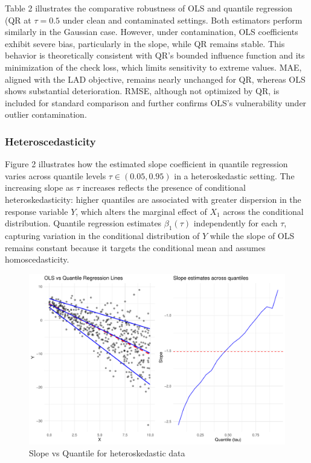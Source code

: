 \documentclass[fleqn,10pt]{latex/stylish_article} %
\begin{document}
Table 2 illustrates the comparative robustness of OLS and quantile regression (QR at \(\tau = 0.5\) under clean and contaminated settings. Both estimators perform similarly in the Gaussian case. However, under contamination, OLS coefficients exhibit severe bias, particularly in the slope, while QR remains stable. This behavior is theoretically consistent with QR's bounded influence function and its minimization of the check loss, which limits sensitivity to extreme values. MAE, aligned with the LAD objective, remains nearly unchanged for QR, whereas OLS shows substantial deterioration. RMSE, although not optimized by QR, is included for standard comparison and further confirms OLS's vulnerability under outlier contamination.

\subsubsection{Heteroscedasticity}\label{heteroscedasticity}

Figure 2 illustrates how the estimated slope coefficient in quantile regression varies across quantile levels \(\tau \in (0.05, 0.95)\) in a heteroskedastic setting. The increasing slope as \(\tau\) increases reflects the presence of conditional heteroskedasticity: higher quantiles are associated with greater dispersion in the response variable \(Y\), which alters the marginal effect of \(X_1\) across the conditional distribution. Quantile regression estimates \(\beta_1(\tau)\) independently for each \(\tau\), capturing variation in the conditional distribution of \(Y\) while the slope of OLS remains constant because it targets the conditional mean and assumes homoscedasticity.

\begin{figure}

{\centering \includegraphics[width=0.8\linewidth]{ADR_project_draft_files/figure-latex/unnamed-chunk-4-1} 

}

\caption{Slope vs Quantile for heteroskedastic data}\label{fig:unnamed-chunk-4}
\end{figure}
\end{document}
